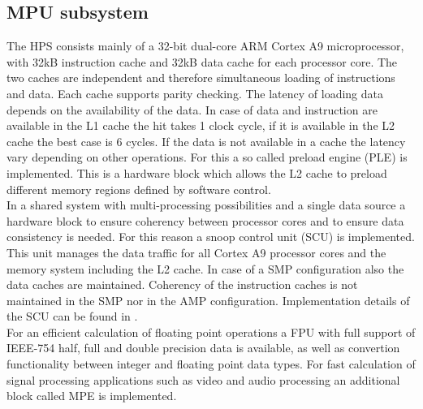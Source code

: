 \subsection{MPU subsystem}
The HPS consists mainly of a 32-bit dual-core ARM Cortex A9 microprocessor, with 32kB instruction cache and 32kB data cache for each processor core. The two caches are independent and therefore simultaneous loading of instructions and data. Each cache supports parity checking. The latency of loading data depends on the availability of the data. In case of data and instruction are available in the L1 cache the hit takes 1 clock cycle, if it is available in the L2 cache the best case is 6 cycles. If the data is not available in a cache the latency vary depending on other operations. For this a so called preload engine (PLE) is implemented. This is a hardware block which allows the L2 cache to preload different memory regions defined by software control.\\
In a shared system with multi-processing possibilities and a single data source a hardware block to ensure coherency between processor cores and to ensure data consistency is needed. For this reason a snoop control unit (SCU) is implemented. This unit manages the data traffic for all Cortex A9 processor cores and the memory system including the L2 cache. In case of a SMP configuration also the data caches are maintained. Coherency of the instruction caches is not maintained in the SMP nor in the AMP configuration. Implementation details of the SCU can be found in \cite[chapter 9]{AlteraHPS15}.\\
For an efficient calculation of floating point operations a FPU with full support of IEEE-754 half, full and double precision data is available, as well as convertion functionality between integer and floating point data types. For fast calculation of signal processing applications such as video and audio processing an additional block called MPE is implemented.
